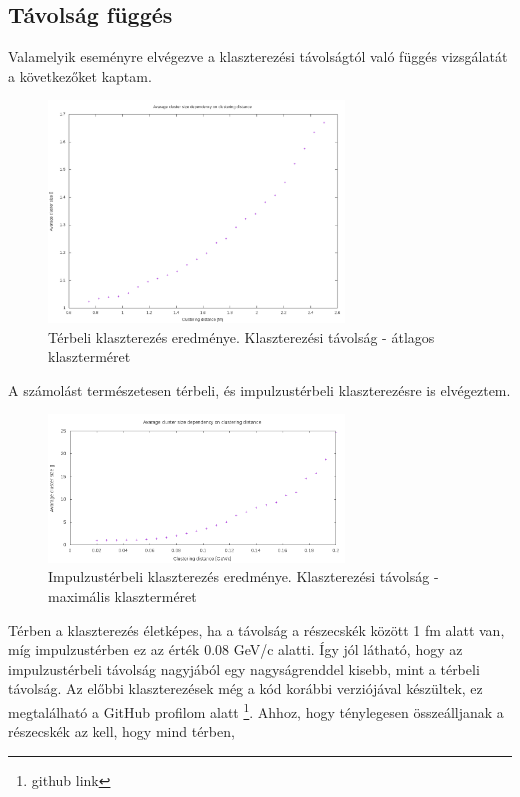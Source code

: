 \documentclass[a4paper,12pt]{article}
\begin{document}
\subsection{ Távolság függés}
\par Valamelyik eseményre elvégezve a klaszterezési távolságtól való függés vizsgálatát a következőket kaptam.
\begin{figure}[H]
	\centering
	\includegraphics[width=0.7\textwidth]{dist-mean.png}
	\caption{ Térbeli klaszterezés eredménye. Klaszterezési távolság - átlagos klaszterméret }
\end{figure}
\par A számolást természetesen térbeli, és impulzustérbeli klaszterezésre is elvégeztem.
\begin{figure}[H]
	\centering
	\includegraphics[width=0.7\textwidth]{momdist-mean.png}
	\caption{ Impulzustérbeli klaszterezés eredménye. Klaszterezési távolság - maximális klaszterméret }
\end{figure}
\par Térben a klaszterezés életképes, ha a távolság a részecskék között 1 fm alatt van, míg impulzustérben ez az érték 0.08 GeV/c alatti. Így jól látható,
hogy az impulzustérbeli távolság nagyjából egy nagyságrenddel kisebb, mint a térbeli távolság. Az előbbi klaszterezések még a kód korábbi verziójával
készültek, ez megtalálható a GitHub profilom alatt \footnote{github link}. Ahhoz, hogy ténylegesen összeálljanak a részecskék az kell, hogy mind térben,
\end{document}
